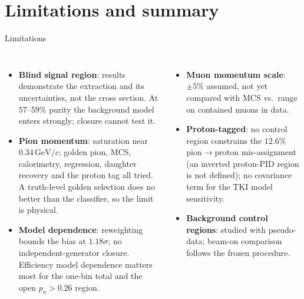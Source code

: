 \documentclass[aspectratio=169,10pt]{beamer}
\newcommand{\GeVc}{\,\text{GeV}/c}
\begin{document}
\section{Limitations and summary}
\begin{frame}{Limitations}
  \begin{columns}[T]
  \small
  \begin{itemize}\setlength\itemsep{4pt}
    \item \textbf{Blind signal region}: results demonstrate the extraction and its uncertainties, not the
      cross section. At $57$--$59\%$ purity the background model enters strongly; closure cannot test it.
    \item \textbf{Pion momentum}: saturation near $0.34\GeVc$; golden pion, MCS, calorimetry, regression,
      daughter recovery and the proton tag all tried. A truth-level golden selection does no better than
      the classifier, so the limit is physical.
    \item \textbf{Model dependence}: reweighting bounds the bias at $1.18\sigma$; no independent-generator
      closure. Efficiency model dependence matters most for the one-bin total and the open $p_\pi>0.26$ region.
  \end{itemize}
  \small
  \begin{itemize}\setlength\itemsep{4pt}
    \item \textbf{Muon momentum scale}: $\pm5\%$ assumed, not yet compared with MCS vs.\ range on contained muons in data.
    \item \textbf{Proton-tagged}: no control region constrains the $12.6\%$ pion$\to$proton mis-assignment
      (an inverted proton-PID region is not defined); no covariance term for the TKI model sensitivity.
    \item \textbf{Background control regions}: studied with pseudo-data; beam-on comparison follows the frozen procedure.
  \end{itemize}
  \end{columns}
\end{frame}
\end{document}
